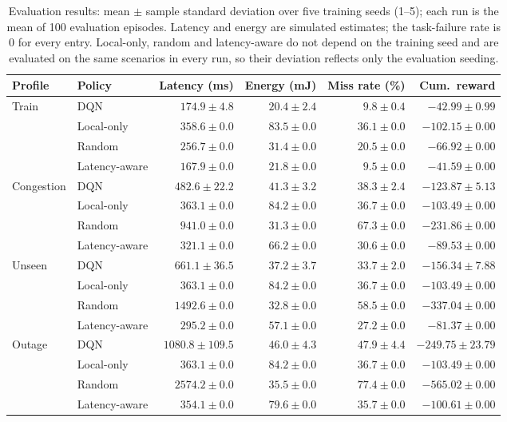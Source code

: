 \begin{table}[t]
\centering\small
\caption{Evaluation results: mean $\pm$ sample standard deviation over five training seeds (1--5); each run is the mean of 100 evaluation episodes. Latency and energy are simulated estimates; the task-failure rate is 0 for every entry. Local-only, random and latency-aware do not depend on the training seed and are evaluated on the same scenarios in every run, so their deviation reflects only the evaluation seeding.}\label{tab:results}
\begin{tabular}{llrrrr}
\toprule
Profile & Policy & Latency (ms) & Energy (mJ) & Miss rate (\%) & Cum.\ reward\\
\midrule
\multirow{4}{*}{Train} & DQN & $174.9\pm4.8$ & $20.4\pm2.4$ & $9.8\pm0.4$ & $-42.99\pm0.99$\\
 & Local-only & $358.6\pm0.0$ & $83.5\pm0.0$ & $36.1\pm0.0$ & $-102.15\pm0.00$\\
 & Random & $256.7\pm0.0$ & $31.4\pm0.0$ & $20.5\pm0.0$ & $-66.92\pm0.00$\\
 & Latency-aware & $167.9\pm0.0$ & $21.8\pm0.0$ & $9.5\pm0.0$ & $-41.59\pm0.00$\\
\midrule
\multirow{4}{*}{Congestion} & DQN & $482.6\pm22.2$ & $41.3\pm3.2$ & $38.3\pm2.4$ & $-123.87\pm5.13$\\
 & Local-only & $363.1\pm0.0$ & $84.2\pm0.0$ & $36.7\pm0.0$ & $-103.49\pm0.00$\\
 & Random & $941.0\pm0.0$ & $31.3\pm0.0$ & $67.3\pm0.0$ & $-231.86\pm0.00$\\
 & Latency-aware & $321.1\pm0.0$ & $66.2\pm0.0$ & $30.6\pm0.0$ & $-89.53\pm0.00$\\
\midrule
\multirow{4}{*}{Unseen} & DQN & $661.1\pm36.5$ & $37.2\pm3.7$ & $33.7\pm2.0$ & $-156.34\pm7.88$\\
 & Local-only & $363.1\pm0.0$ & $84.2\pm0.0$ & $36.7\pm0.0$ & $-103.49\pm0.00$\\
 & Random & $1492.6\pm0.0$ & $32.8\pm0.0$ & $58.5\pm0.0$ & $-337.04\pm0.00$\\
 & Latency-aware & $295.2\pm0.0$ & $57.1\pm0.0$ & $27.2\pm0.0$ & $-81.37\pm0.00$\\
\midrule
\multirow{4}{*}{Outage} & DQN & $1080.8\pm109.5$ & $46.0\pm4.3$ & $47.9\pm4.4$ & $-249.75\pm23.79$\\
 & Local-only & $363.1\pm0.0$ & $84.2\pm0.0$ & $36.7\pm0.0$ & $-103.49\pm0.00$\\
 & Random & $2574.2\pm0.0$ & $35.5\pm0.0$ & $77.4\pm0.0$ & $-565.02\pm0.00$\\
 & Latency-aware & $354.1\pm0.0$ & $79.6\pm0.0$ & $35.7\pm0.0$ & $-100.61\pm0.00$\\
\bottomrule
\end{tabular}
\end{table}

